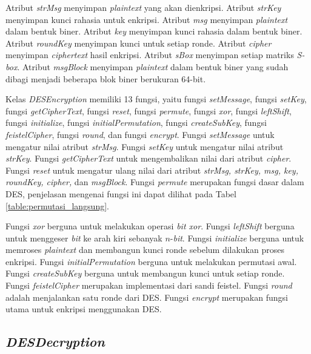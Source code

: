 Atribut \textit{strMsg} menyimpan \textit{plaintext} yang akan dienkripsi. Atribut \textit{strKey} menyimpan kunci rahasia untuk enkripsi. Atribut \textit{msg} menyimpan \textit{plaintext} dalam bentuk biner. Atribut \textit{key} menyimpan kunci rahasia dalam bentuk biner. Atribut \textit{roundKey} menyimpan kunci untuk setiap ronde. Atribut \textit{cipher} menyimpan \textit{ciphertext} hasil enkripsi. Atribut \textit{sBox} menyimpan setiap matriks \textit{S-box}. Atribut \textit{msgBlock} menyimpan \textit{plaintext} dalam bentuk biner yang sudah dibagi menjadi beberapa blok biner berukuran 64-bit.

Kelas \textit{DESEncryption} memiliki 13 fungsi, yaitu fungsi \textit{setMessage}, fungsi \textit{setKey}, fungsi \textit{getCipherText}, fungsi \textit{reset}, fungsi \textit{permute}, fungsi \textit{xor}, fungsi \textit{leftShift}, fungsi \textit{initialize}, fungsi \textit{initialPermutation}, fungsi \textit{createSubKey}, fungsi \textit{feistelCipher}, fungsi \textit{round}, dan fungsi \textit{encrypt}. Fungsi \textit{setMessage} untuk mengatur nilai atribut \textit{strMsg}. Fungsi \textit{setKey} untuk mengatur nilai atribut \textit{strKey}. Fungsi \textit{getCipherText} untuk mengembalikan nilai dari atribut \textit{cipher}. Fungsi \textit{reset} untuk mengatur ulang nilai dari atribut \textit{strMsg, strKey, msg, key, roundKey, cipher,} dan \textit{msgBlock}. Fungsi \textit{permute} merupakan fungsi dasar dalam DES, penjelasan mengenai fungsi ini dapat dilihat pada Tabel \ref{table:permutasi_langsung}.

Fungsi \textit{xor} berguna untuk melakukan operasi \textit{bit xor}. Fungsi \textit{leftShift} berguna untuk menggeser \textit{bit} ke arah kiri sebanyak \begin{math}n\end{math}-\textit{bit}. Fungsi \textit{initialize} berguna untuk memroses \textit{plaintext} dan membangun kunci ronde sebelum dilakukan proses enkripsi. Fungsi \textit{initialPermutation} berguna untuk melakukan permutasi awal. Fungsi \textit{createSubKey} berguna untuk membangun kunci untuk setiap ronde. Fungsi \textit{feistelCipher} merupakan implementasi dari sandi feistel. Fungsi \textit{round} adalah menjalankan satu ronde dari DES. Fungsi \textit{encrypt} merupakan fungsi utama untuk enkripsi menggunakan DES.

\subsection{\textit{DESDecryption}}

